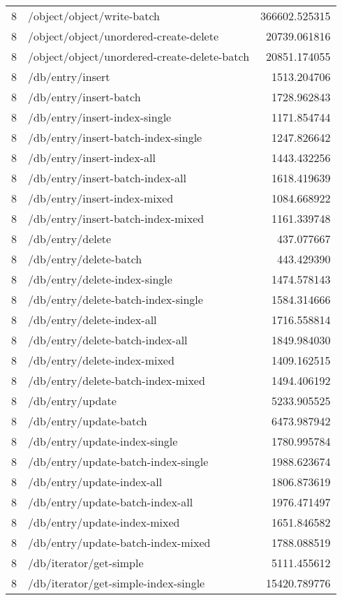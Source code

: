 \begin{longtable}{rlr}
8 & /object/object/write-batch & 366602.525315 \\
8 & /object/object/unordered-create-delete & 20739.061816 \\
8 & /object/object/unordered-create-delete-batch & 20851.174055 \\
8 & /db/entry/insert & 1513.204706 \\
8 & /db/entry/insert-batch & 1728.962843 \\
8 & /db/entry/insert-index-single & 1171.854744 \\
8 & /db/entry/insert-batch-index-single & 1247.826642 \\
8 & /db/entry/insert-index-all & 1443.432256 \\
8 & /db/entry/insert-batch-index-all & 1618.419639 \\
8 & /db/entry/insert-index-mixed & 1084.668922 \\
8 & /db/entry/insert-batch-index-mixed & 1161.339748 \\
8 & /db/entry/delete & 437.077667 \\
8 & /db/entry/delete-batch & 443.429390 \\
8 & /db/entry/delete-index-single & 1474.578143 \\
8 & /db/entry/delete-batch-index-single & 1584.314666 \\
8 & /db/entry/delete-index-all & 1716.558814 \\
8 & /db/entry/delete-batch-index-all & 1849.984030 \\
8 & /db/entry/delete-index-mixed & 1409.162515 \\
8 & /db/entry/delete-batch-index-mixed & 1494.406192 \\
8 & /db/entry/update & 5233.905525 \\
8 & /db/entry/update-batch & 6473.987942 \\
8 & /db/entry/update-index-single & 1780.995784 \\
8 & /db/entry/update-batch-index-single & 1988.623674 \\
8 & /db/entry/update-index-all & 1806.873619 \\
8 & /db/entry/update-batch-index-all & 1976.471497 \\
8 & /db/entry/update-index-mixed & 1651.846582 \\
8 & /db/entry/update-batch-index-mixed & 1788.088519 \\
8 & /db/iterator/get-simple & 5111.455612 \\
8 & /db/iterator/get-simple-index-single & 15420.789776 \\

\end{longtable}

